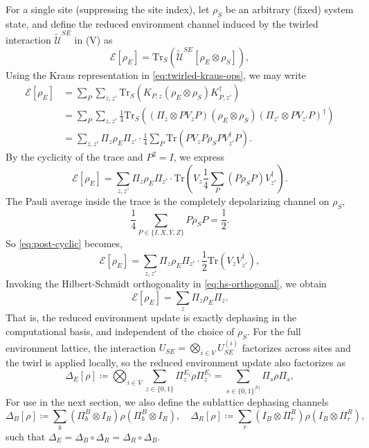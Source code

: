\documentclass[
    aps,
    prx,
    reprint,
    superscriptaddress,
    longbibliography,
    nofootinbib,
    floatfix,
]{revtex4-2}
\newcommand{\Tr}{\mathrm{Tr}}
\begin{document}
For a single site (suppressing the site index), let \(\rho_S\) be an arbitrary (fixed) system state, and define the reduced environment channel induced by the twirled interaction \(\widetilde{\mathcal{U}}^{SE}\) in (V) as
\begin{equation}\label{eq:system-partial-trace}
    \mathcal{E}[\rho_E] = \Tr_S(\widetilde{\mathcal{U}}^{SE}[\rho_E \otimes \rho_S]),
\end{equation}
Using the Kraus representation in \cref{eq:twirled-kraus-ops}, we may write
\begin{equation}
    \begin{split}
        \mathcal{E}[\rho_E] 
        &= \sum_P \sum_{z,z'} \Tr_S(K_{P, z} (\rho_E \otimes \rho_S) K_{P, z'}^\dagger) \\
        &= \sum_P \sum_{z,z'} \frac{1}{4} \Tr_S((\Pi_z \otimes PV_zP) (\rho_E \otimes \rho_S) (\Pi_{z'} \otimes PV_{z'}P)^\dagger) \\
        &= \sum_{z,z'} \Pi_z \rho_E \Pi_{z'} \cdot \frac{1}{4} \sum_P \Tr(P V_z P \rho_S P V_{z'}^\dagger P).
    \end{split}
\end{equation}
By the cyclicity of the trace and \(P^2 = I\), we express
\begin{equation}\label{eq:post-cyclic}
    \mathcal{E}[\rho_E] = \sum_{z,z'} \Pi_z \rho_E \Pi_{z'} \cdot \Tr(V_z \frac{1}{4}\sum_P(P \rho_S P) V_{z'}^\dagger).
\end{equation}
The Pauli average inside the trace is the completely depolarizing channel on \(\rho_S\),
\begin{equation}
    \frac{1}{4}\sum_{P \in \{I,X,Y,Z\}} P \rho_S P = \frac{\mathbb{I}}{2}.
\end{equation}
So \cref{eq:post-cyclic} becomes,
\begin{equation}
    \mathcal{E}[\rho_E] = \sum_{z,z'} \Pi_z \rho_E \Pi_{z'} \cdot \frac{1}{2} \Tr(V_z V_{z'}^\dagger),
\end{equation}
Invoking the Hilbert-Schmidt orthogonality in \cref{eq:hs-orthogonal}, we obtain
\begin{equation}
    \mathcal{E}[\rho_E] = \sum_z \Pi_z \rho_E \Pi_z.
\end{equation}
That is, the reduced environment update is exactly dephasing in the computational basis, and independent of the choice of \(\rho_S\). For the full environment lattice, the interaction \(U_{SE} = \bigotimes_{i\in V} U_{SE}^{(i)}\) factorizes across sites and the twirl is applied locally, so the reduced environment update also factorizes as
\begin{equation}
    \Delta_E[\rho] 
    \coloneq \bigotimes_{i\in V} \sum_{z\in\{0,1\}} \Pi_z^{E_i} \rho \Pi_z^{E_i}
    = \sum_{s \in \{0,1\}^{|V|}} \Pi_s \rho \Pi_s,
\end{equation}
For use in the next section, we also define the sublattice dephasing channels
\begin{equation}
    \Delta_B[\rho] \coloneq \sum_b(\Pi_b^B \otimes I_R) \rho (\Pi_b^B \otimes I_R), \quad
    \Delta_R[\rho] \coloneq \sum_r(I_B \otimes \Pi_r^R) \rho (I_B \otimes \Pi_r^R),
\end{equation}
such that \(\Delta_E = \Delta_B \circ \Delta_R = \Delta_R \circ \Delta_B\).
\end{document}
